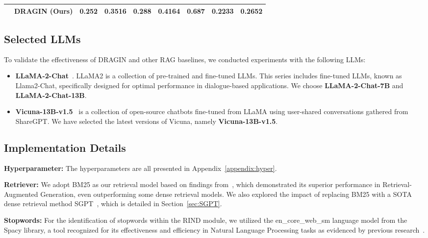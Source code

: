 \begin{table*}[t]
\begin{tabular}{ccccccccc}
                                          & \textbf{DRAGIN (Ours)} & \textbf{0.252}& \textbf{0.3516}& \textbf{0.288}& \textbf{0.4164}& \textbf{0.687}               & \textbf{0.2233}& \textbf{0.2652}\\
                                          \toprule
\end{tabular}
\end{table*}
\subsection{Selected LLMs}
To validate the effectiveness of DRAGIN and other RAG baselines, we conducted experiments with the following LLMs:

\begin{itemize}[leftmargin=*]
\item \textbf{LLaMA-2-Chat}~\cite{touvron2023llama2}. LLaMA2 is a collection of pre-trained and fine-tuned LLMs. This series includes fine-tuned LLMs, known as Llama2-Chat, specifically designed for optimal performance in dialogue-based applications. We choose \textbf{LLaMA-2-Chat-7B} and \textbf{LLaMA-2-Chat-13B}.

\item \textbf{Vicuna-13B-v1.5}~\cite{chiang2023vicuna} is a collection of open-source chatbots fine-tuned from LLaMA using user-shared conversations gathered from ShareGPT. We have selected the latest versions of Vicuna, namely \textbf{Vicuna-13B-v1.5}.

\end{itemize}

\subsection{Implementation Details}\label{sec:implement}

\noindent \textbf{Hyperparameter:} The hyperparameters are all presented in Appendix~\ref{appendix:hyper}.

\noindent \textbf{Retriever:} We adopt BM25 as our retrieval model based on findings from~\cite{ram2023context}, which demonstrated its superior performance in Retrieval-Augmented Generation, even outperforming some dense retrieval models. We also explored the impact of replacing BM25 with a SOTA dense retrieval method SGPT~\cite{muennighoff2022sgpt}, which is detailed in Section~\ref{sec:SGPT}.

\noindent \textbf{Stopwords:} 
For the identification of stopwords within the RIND module, we utilized the en\_core\_web\_sm language model from the Spacy library, a tool recognized for its effectiveness and efficiency in Natural Language Processing tasks as evidenced by previous research~\cite{shelar2020named}.

